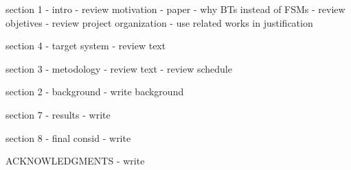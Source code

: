 section 1 - intro
- review motivation - paper
- why BTs instead of FSMs
- review objetives
- review project organization
- use related works in justification

section 4 - target system
- review text

section 3 - metodology
- review text
- review schedule

section 2 - background
- write background

section 7 - results
- write

section 8 - final consid
- write

ACKNOWLEDGMENTS
- write
